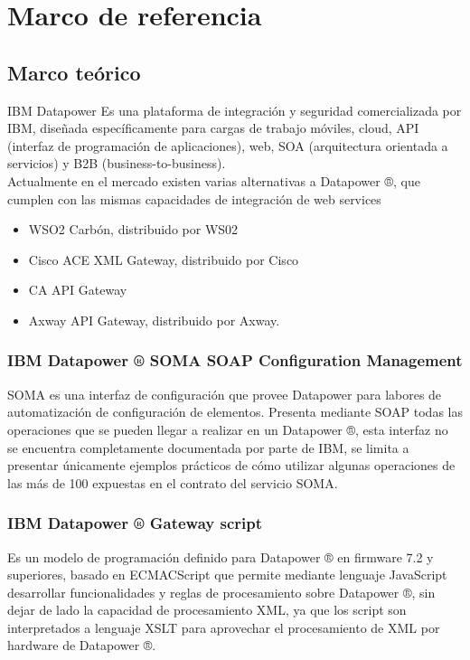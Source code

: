 \section{Marco de referencia}
\subsection{Marco teórico}
IBM Datapower Es una plataforma de integración y seguridad comercializada por IBM, diseñada específicamente para cargas de trabajo móviles, cloud, API (interfaz de programación de aplicaciones), web, SOA (arquitectura orientada a servicios) y B2B (business-to-business).
\\
Actualmente en el mercado existen varias alternativas a Datapower ®, que cumplen con las mismas capacidades de integración de web services 
\begin{itemize}
    \item WSO2 Carbón, distribuido por WS02 
    \item Cisco ACE XML Gateway, distribuido por Cisco
    \item CA API Gateway
    \item Axway API Gateway, distribuido por Axway.
\end{itemize}






\subsubsection{IBM Datapower ® SOMA SOAP Configuration Management}
SOMA es una interfaz de configuración que provee Datapower \cite{id1} para labores de automatización de configuración de elementos. Presenta mediante SOAP todas las operaciones que se pueden llegar a realizar en un Datapower ®, esta interfaz no se encuentra completamente documentada por parte de IBM, se limita a presentar únicamente ejemplos prácticos de cómo utilizar algunas operaciones de las más de 100 expuestas en el contrato del servicio SOMA.
\subsubsection{IBM Datapower ® Gateway script}
Es un modelo de programación definido para Datapower ® en firmware 7.2 y superiores, basado en ECMACScript que permite mediante lenguaje 
JavaScript desarrollar funcionalidades y reglas de procesamiento sobre Datapower ®, sin dejar de lado la capacidad de procesamiento XML, ya que los script son interpretados a lenguaje XSLT para aprovechar el procesamiento de XML por hardware de Datapower ®.
